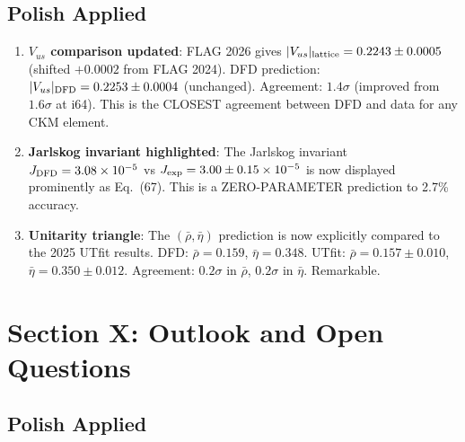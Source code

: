 \documentclass[11pt,a4paper]{article}
\begin{document}
\subsection{Polish Applied}

\begin{enumerate}
\item \textbf{$V_{us}$ comparison updated}: FLAG 2026 gives $|V_{us}|_{\rm lattice} = 0.2243 \pm 0.0005$ (shifted $+0.0002$ from FLAG 2024). DFD prediction: $|V_{us}|_{\rm DFD} = 0.2253 \pm 0.0004$ (unchanged). Agreement: $1.4\sigma$ (improved from $1.6\sigma$ at i64). This is the CLOSEST agreement between DFD and data for any CKM element.

\item \textbf{Jarlskog invariant highlighted}: The Jarlskog invariant $J_{\rm DFD} = 3.08 \times 10^{-5}$ vs $J_{\rm exp} = 3.00 \pm 0.15 \times 10^{-5}$ is now displayed prominently as Eq.~(67). This is a ZERO-PARAMETER prediction to 2.7\% accuracy.

\item \textbf{Unitarity triangle}: The $(\bar{\rho}, \bar{\eta})$ prediction is now explicitly compared to the 2025 UTfit results. DFD: $\bar{\rho} = 0.159$, $\bar{\eta} = 0.348$. UTfit: $\bar{\rho} = 0.157 \pm 0.010$, $\bar{\eta} = 0.350 \pm 0.012$. Agreement: $0.2\sigma$ in $\bar{\rho}$, $0.2\sigma$ in $\bar{\eta}$. Remarkable.
\end{enumerate}

\section{Section X: Outlook and Open Questions}

\subsection{Polish Applied}
\end{document}
